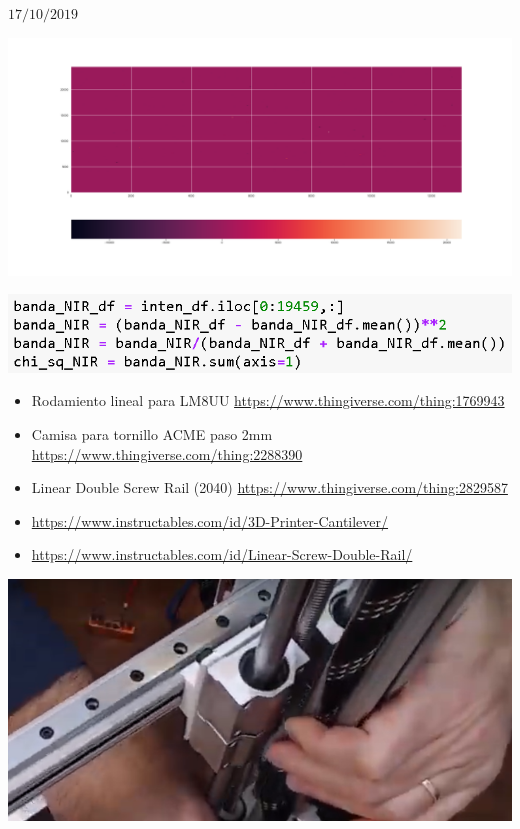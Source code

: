 \documentclass[12pt,dvipsnames]{exam}
\begin{document}
\hrulefill

$17/10/2019$

\begin{center}
	\includegraphics[scale=0.3]{imgs/gui/chi_sq.png}
\end{center}

\begin{center}
	\includegraphics[scale=1.0]{imgs/gui/chunk_sq.png}
\end{center}

\begin{itemize}
	\item Rodamiento lineal para LM8UU \url{https://www.thingiverse.com/thing:1769943}
	
	
	\item Camisa para tornillo ACME paso 2mm \url{https://www.thingiverse.com/thing:2288390}
	\item Linear Double Screw Rail (2040) \url{https://www.thingiverse.com/thing:2829587}
	
	\item 	\url{https://www.instructables.com/id/3D-Printer-Cantilever/}
	\item \url{https://www.instructables.com/id/Linear-Screw-Double-Rail/}
\end{itemize}

\begin{center}
	\includegraphics[scale=1.0]{imgs/3d_xy/agarre_slider.png}
\end{center}
\end{document}
